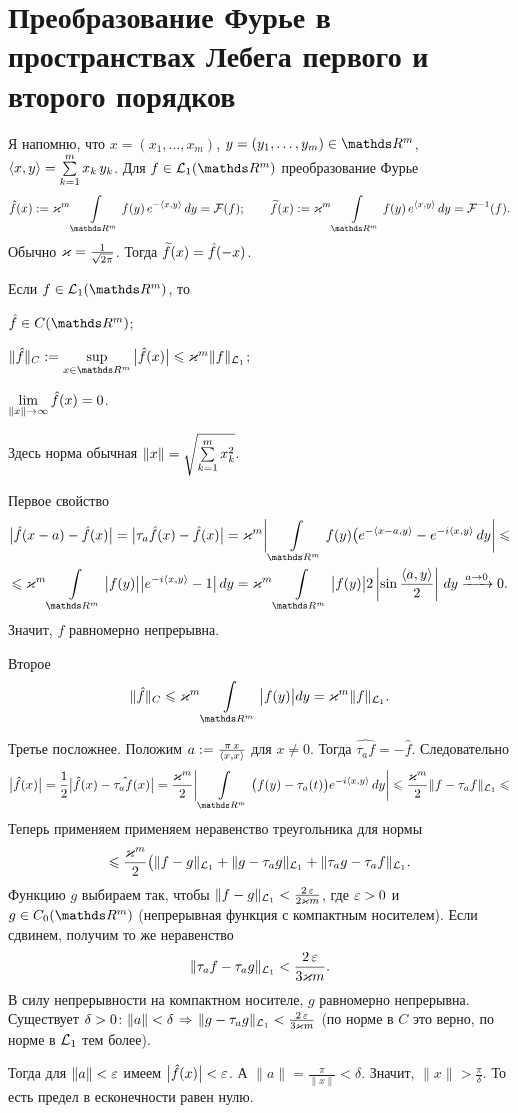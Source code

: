 \section{Преобразование Фурье в пространствах Лебега первого и второго порядков}
Я напомню, что $x=(x_1,\dots,x_m)$, $y=(y_1,\dots,y_m)\in\R^m$, $\langle x,y\rangle = \sum\limits_{k = 1}^{m} x_k\,y_k$. Для  $f\in\L_1(\R^m)$ преобразование Фурье
\[
  \hat f(x) :=\k^m\Gint{\R^m}f(y)\,e^{-\la x,y\ra}\,dy = \Fu(f);\qquad
  \Til f(x) :=\k^m\Gint{\R^m}f(y)\,e^{\la x,y\ra}\,dy = \Fu^{-1}(f).
\]
Обычно $\varkappa=\frac1{\sqrt{2\pi}}$. Тогда $\widetilde{f}{}(x) = \hat f(-x)$. 

\begin{Lem}\label{RimLeb}
  Если $f\in\L_1(\R^m)$, то
\begin{roItems}
\item $\hat f\in C(\R^m)$;
\item $\|\hat f\|_C:=\sup\limits_{x\in\R^m}\big|\hat f(x)\big|\le\k^m\|f\|_{\L_1}$;
\item $\lim\limits_{\|x\|\rightarrow\infty}\hat f(x)=0$.
\end{roItems}
\end{Lem}
Здесь норма обычная $\|x\| = \sqrt{\sum\limits_{k = 1}^{m}x_k^2}$.

\begin{Proof}
  Первое свойство
\begin{multline*}
  \big|\hat f(x-a)-\hat f(x)\big| = \big|\tau_a\hat f(x)-\hat f(x)\big| =
  \k^m\bigg|\Gint{\R^m}f(y)\big(e^{-\la x-a,y\ra} - e^{-i\la x,y\ra}\,dy\bigg|\le\\ \le
  \k^m\Gint{\R^m}\big|f(y)\big|\big| e^{-i\la x,y\ra}-1\big|\,dy = 
  \k^m\Gint{\R^m}\big|f(y)\big| 2\left|\sin\frac{\la a,y\ra}2\right|\,dy\xrightarrow{a\to0}0.
\end{multline*}
Значит, $f$ равномерно непрерывна.

Второе
\[
  \|\hat f\|_C\le \k^m\Gint{\R^m}\big|f(y)\big|dy = \k^m\|f\|_{\L_1}.
\]

Третье посложнее. Положим $a:=\frac{\pi\,x}{\langle x,x\rangle}$ для $x\ne0$. Тогда $\hat{\tau_a f} = -\hat f$. Следовательно
\[
  \big|\hat f(x)\big| = \frac12\big|\hat f(x)-\hat{\tau_af}(x)\big| = 
 \frac{\k^m}2\bigg|\Gint{\R^m}\big(f(y)-\tau_a(t)\big)e^{-i\la x,y\ra}\,dy\bigg|\le
\frac{\k^m}2 \|f-\tau_af\|_{\L_1}\le
\]
Теперь применяем применяем неравенство треугольника для нормы
\[
  \leqslant\frac{\varkappa^m}2\big(\|f-g\|_{\mathcal L_1}+\|g-\tau_ag\|_{\mathcal L_1}+\|\tau_ag-\tau_af\|_{\mathcal L_1}.
\]
Функцию $g$ выбираем так, чтобы $\|f-g\|_{\mathcal L_1}<\frac{2\,\varepsilon}{2\varkappa m}$, где $\varepsilon>0$ и $g\in C_0(\R^m)$ (непрерывная функция с компактным носителем). Если сдвинем, получим то же неравенство
\[
 \|\tau_a f-\tau_ag\|_{\mathcal L_1}<\frac{2\,\varepsilon}{3\varkappa m}.
\]
В силу непрерывности на компактном носителе, $g$ равномерно непрерывна. Существует $\delta>0\colon \|a\|<\delta\hspace{1pt plus1pt}\Rightarrow\hspace{1pt plus1pt} \|g-\tau_ag\|_{\mathcal L_1}<\frac{2\,\varepsilon}{3\varkappa m}$ (по норме в $C$ это верно, по норме в $\mathcal L_1$ тем более).

Тогда для $\|a\|<\varepsilon$ имеем $\big|\hat f(x)\big|<\varepsilon$. А $\|a\| = \frac\pi{\|x\|}<\delta$. Значит, $\|x\|>\frac\pi\delta$. То есть предел в есконечности равен нулю.
\end{Proof}

